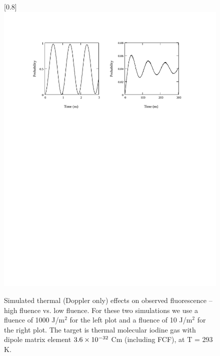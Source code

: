 \begin{figure}
\scalebox{0.8}[0.8]{
\includegraphics[bb=35 515 550 700]
{doppler_only/doppler_only.pdf}
}
\caption[Simulated thermal (Doppler only) effects on observed fluorescence -- high fluence vs. low fluence]{Simulated thermal (Doppler only) effects on observed fluorescence -- high fluence vs. low fluence. For these two simulations we use a fluence of 1000 J/m$^2$ for the left plot and a fluence of 10 J/m$^2$ for the right plot. The target is thermal molecular iodine gas with dipole matrix element $3.6\times10^{-32}$ Cm (including FCF), at T = 293 K.}
\label{doppler_only}
\end{figure}
